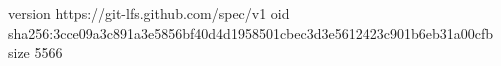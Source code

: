 version https://git-lfs.github.com/spec/v1
oid sha256:3cce09a3c891a3e5856bf40d4d1958501cbec3d3e5612423c901b6eb31a00cfb
size 5566
